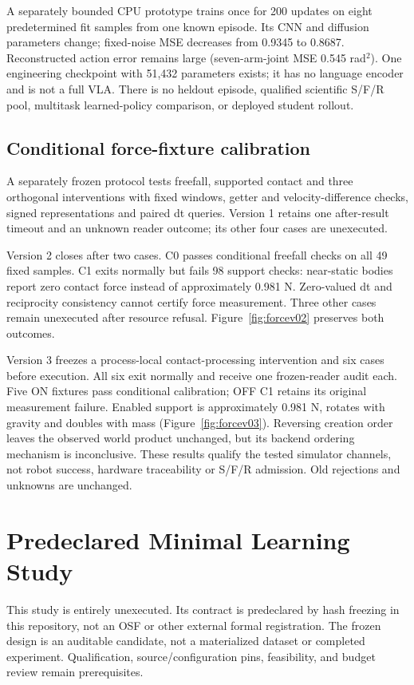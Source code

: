 \documentclass{article}
\begin{document}
A separately bounded CPU prototype trains once for 200 updates on eight predetermined fit samples from one known episode. Its CNN and diffusion parameters change; fixed-noise MSE decreases from 0.9345 to 0.8687. Reconstructed action error remains large (seven-arm-joint MSE 0.545 rad$^2$). One engineering checkpoint with 51,432 parameters exists; it has no language encoder and is not a full VLA. There is no heldout episode, qualified scientific S/F/R pool, multitask learned-policy comparison, or deployed student rollout.

\subsection{Conditional force-fixture calibration}
A separately frozen protocol tests freefall, supported contact and three orthogonal interventions with fixed windows, getter and velocity-difference checks, signed representations and paired dt queries. Version 1 retains one after-result timeout and an unknown reader outcome; its other four cases are unexecuted.

Version 2 closes after two cases. C0 passes conditional freefall checks on all 49 fixed samples. C1 exits normally but fails 98 support checks: near-static bodies report zero contact force instead of approximately 0.981 N. Zero-valued dt and reciprocity consistency cannot certify force measurement. Three other cases remain unexecuted after resource refusal. Figure~\ref{fig:forcev02} preserves both outcomes.

Version 3 freezes a process-local contact-processing intervention and six cases before execution. All six exit normally and receive one frozen-reader audit each. Five ON fixtures pass conditional calibration; OFF C1 retains its original measurement failure. Enabled support is approximately 0.981 N, rotates with gravity and doubles with mass (Figure~\ref{fig:forcev03}). Reversing creation order leaves the observed world product unchanged, but its backend ordering mechanism is inconclusive. These results qualify the tested simulator channels, not robot success, hardware traceability or S/F/R admission. Old rejections and unknowns are unchanged.

\section{Predeclared Minimal Learning Study}
\label{sec:plan}
This study is entirely unexecuted. Its contract is predeclared by hash freezing in this repository, not an OSF or other external formal registration. The frozen design is an auditable candidate, not a materialized dataset or completed experiment. Qualification, source/configuration pins, feasibility, and budget review remain prerequisites.
\end{document}
